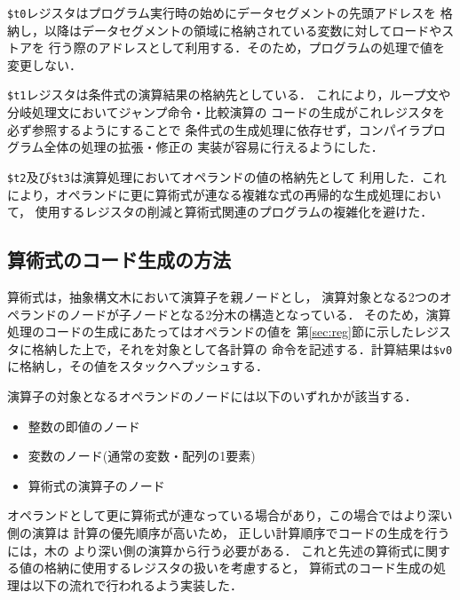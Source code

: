 \verb|$t0|レジスタはプログラム実行時の始めにデータセグメントの先頭アドレスを
格納し，以降はデータセグメントの領域に格納されている変数に対してロードやストアを
行う際のアドレスとして利用する．そのため，プログラムの処理で値を変更しない．

\verb|$t1|レジスタは条件式の演算結果の格納先としている．
これにより，ループ文や分岐処理文においてジャンプ命令・比較演算の
コードの生成がこれレジスタを必ず参照するようにすることで
条件式の生成処理に依存せず，コンパイラプログラム全体の処理の拡張・修正の
実装が容易に行えるようにした．

\verb|$t2|及び\verb|$t3|は演算処理においてオペランドの値の格納先として
利用した．これにより，オペランドに更に算術式が連なる複雑な式の再帰的な生成処理において，
使用するレジスタの削減と算術式関連のプログラムの複雑化を避けた．

\subsection{算術式のコード生成の方法}
算術式は，抽象構文木において演算子を親ノードとし，
演算対象となる2つのオペランドのノードが子ノードとなる2分木の構造となっている．
そのため，演算処理のコードの生成にあたってはオペランドの値を
第\ref{sec:reg}節に示したレジスタに格納した上で，それを対象として各計算の
命令を記述する．計算結果は\verb|$v0|に格納し，その値をスタックへプッシュする．

演算子の対象となるオペランドのノードには以下のいずれかが該当する．
\begin{itemize}
  \item 整数の即値のノード
  \item 変数のノード(通常の変数・配列の1要素)
  \item 算術式の演算子のノード
\end{itemize}
オペランドとして更に算術式が連なっている場合があり，この場合ではより深い側の演算は
計算の優先順序が高いため，
正しい計算順序でコードの生成を行うには，木の
より深い側の演算から行う必要がある．
これと先述の算術式に関する値の格納に使用するレジスタの扱いを考慮すると，
算術式のコード生成の処理は以下の流れで行われるよう実装した．

